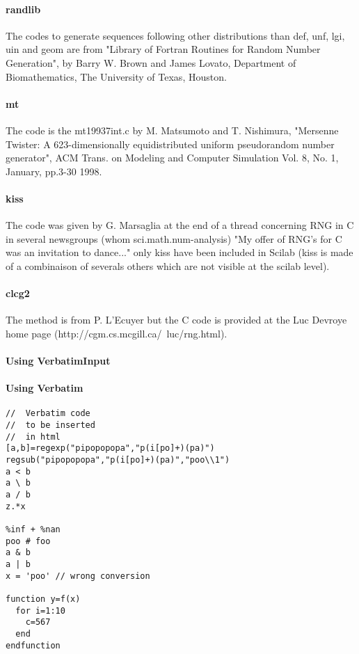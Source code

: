\begin{authors}
  \paragraph{randlib} 
  The codes to generate sequences following other distributions than def, unf, lgi,  uin and geom are
  from "Library of Fortran Routines for Random Number  Generation", by Barry W. Brown 
  and James Lovato, Department of Biomathematics, The University of Texas, Houston.  
  \paragraph{mt} 
  The code is the mt19937int.c by M. Matsumoto and  T. Nishimura, "Mersenne Twister: 
  A 623-dimensionally equidistributed  uniform pseudorandom number generator", 
  ACM Trans. on Modeling and  Computer Simulation Vol. 8, No. 1, January, pp.3-30 1998.
  \paragraph{kiss} 
  The code was given by G. Marsaglia at the end of a thread concerning RNG in C in several 
  newsgroups (whom sci.math.num-analysis) "My offer of  RNG's for C was an invitation 
  to dance..." only kiss have been included in Scilab (kiss is made of a combinaison of 
  severals others which are not visible at the scilab level).
  \paragraph{clcg2} 
  The method is from P. L'Ecuyer but the C code is provided at the Luc  Devroye home page 
  (http://cgm.cs.mcgill.ca/~luc/rng.html).
\end{authors}


\paragraph{Using VerbatimInput}


\paragraph{Using Verbatim}

\begin{Verbatim}
//	Verbatim code 
//	to be inserted 
//	in html
[a,b]=regexp("pipopopopa","p(i[po]+)(pa)")
regsub("pipopopopa","p(i[po]+)(pa)","poo\\1")
a < b 
a \ b  
a / b 
z.*x

%inf + %nan 
poo # foo 
a & b 
a | b 
x = 'poo' // wrong conversion

function y=f(x)
  for i=1:10
    c=567
  end
endfunction
\end{Verbatim}

